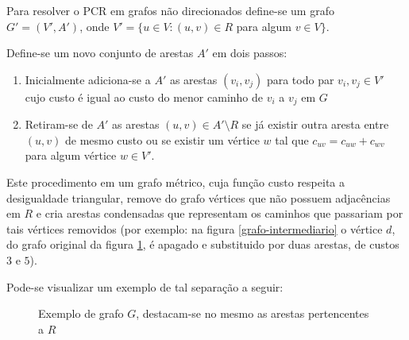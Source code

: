         Para resolver o PCR em grafos não direcionados define-se um grafo $G' = (V', A')$, onde $V' = \{ u \in V : (u, v) \in R$ para algum $v \in V\}$.

        Define-se um novo conjunto de arestas $A'$ em dois passos:
        
        \begin{enumerate}
            \item Inicialmente adiciona-se a $A'$ as arestas $(v_i, v_j)$ para todo par $v_i, v_j \in V'$ cujo custo é igual ao custo do menor caminho de $v_i$ a $v_j$ em $G$
            \item Retiram-se de $A'$ as arestas $(u, v) \in A' \setminus R$ se já existir outra aresta entre $(u, v)$ de mesmo custo ou se existir um vértice $w$ tal que $c_{uv} = c_{uw} + c_{wv}$ para algum vértice $w \in V'$.
        \end{enumerate}

        Este procedimento em um grafo métrico, cuja função custo respeita a desigualdade triangular, remove do grafo vértices que não possuem adjacências em $R$ e cria arestas condensadas que representam os caminhos que passariam por tais vértices removidos (por exemplo: na figura \ref{grafo-intermediario} o vértice $d$, do grafo original da figura \ref{grafo-original}, é apagado e substituido por duas arestas, de custos $3$ e $5$).

        Pode-se visualizar um exemplo de tal separação a seguir:

        \begin{figure}[H]
            \centering
            \caption{Exemplo de grafo $G$, destacam-se no mesmo as arestas pertencentes a $R$}
            \label{grafo-original}
        \end{figure}

